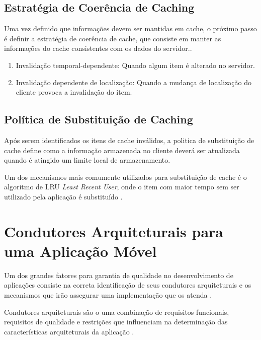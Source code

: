 \documentclass[
	article,			%
	11pt,				%
	oneside,			%
	a4paper,			%
	english,			%
	brazil,				%
	sumario=tradicional
]{abntex2}
\begin{document}
\subsection{Estratégia de Coerência de Caching}
Uma vez definido que informações devem ser mantidas em cache, o próximo passo é definir a estratégia de coerência de cache, que consiste em manter as informações do cache consistentes com os dados do servidor..

\begin{enumerate}
	\item Invalidação temporal-dependente:  Quando algum item é alterado no servidor.
	\item Invalidação dependente de localização: Quando a mudança de localização do cliente provoca a invalidação do item.
\end{enumerate}

\subsection{Política de Substituição de Caching}
Após serem identificados os itens de cache inválidos, a politica de substituição de cache define como a informação armazenada no cliente deverá ser atualizada quando é atingido um limite local de armazenamento.

Um dos mecanismos mais comumente utilizados para substituição de cache é o algoritmo de LRU \emph{Least Recent User}, onde o item com maior tempo sem ser utilizado pela aplicação é substituído \cite{xing2015user}.

\section{Condutores Arquiteturais para uma Aplicação Móvel}
Um dos grandes fatores para garantia de qualidade no desenvolvimento de aplicações consiste na correta identificação de seus condutores arquiteturais e os mecanismos que irão assegurar uma implementação que os atenda \cite{bachmann2001introduction}.

Condutores arquiteturais são o uma combinação de requisitos funcionais, requisitos de qualidade e restrições que influenciam na determinação das características arquiteturais da aplicação \cite{bachmann2001introduction}.
\end{document}
